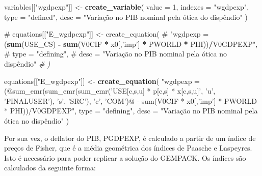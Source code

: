 \documentclass[12pt,twoside]{article}
\newenvironment{Shaded}{\begin{snugshade}}{\end{snugshade}}
\newcommand{\CommentTok}[1]{\textcolor[rgb]{0.56,0.35,0.01}{\textit{#1}}}
\newcommand{\DataTypeTok}[1]{\textcolor[rgb]{0.13,0.29,0.53}{#1}}
\newcommand{\DecValTok}[1]{\textcolor[rgb]{0.00,0.00,0.81}{#1}}
\newcommand{\KeywordTok}[1]{\textcolor[rgb]{0.13,0.29,0.53}{\textbf{#1}}}
\newcommand{\NormalTok}[1]{#1}
\newcommand{\OperatorTok}[1]{\textcolor[rgb]{0.81,0.36,0.00}{\textbf{#1}}}
\newcommand{\StringTok}[1]{\textcolor[rgb]{0.31,0.60,0.02}{#1}}
\let\oldShaded\Shaded
\let\endoldShaded\endShaded
\renewenvironment{Shaded}{\footnotesize\oldShaded}{\endoldShaded}
\begin{document}
\begin{Shaded}
\begin{Highlighting}[]
\NormalTok{variables[[}\StringTok{"wgdpexp"}\NormalTok{]] <-}\StringTok{ }\KeywordTok{create_variable}\NormalTok{(}
  \DataTypeTok{value =} \DecValTok{1}\NormalTok{,}
  \DataTypeTok{indexes =} \StringTok{"wgdpexp"}\NormalTok{,}
  \DataTypeTok{type =} \StringTok{"defined"}\NormalTok{,}
  \DataTypeTok{desc =} \StringTok{"Variação no PIB nominal pela ótica do dispêndio"}
\StringTok{)}

\StringTok{# equations[["}\NormalTok{E_wgdpexp}\StringTok{"]] <- create_equation(}
\StringTok{#   "}\DataTypeTok{wgdpexp =}\NormalTok{ (}\KeywordTok{sum}\NormalTok{(USE_CS) }\OperatorTok{-}\StringTok{ }\KeywordTok{sum}\NormalTok{(V0CIF }\OperatorTok{*}\StringTok{ }\NormalTok{x0[,}\StringTok{'imp'}\NormalTok{] }\OperatorTok{*}\StringTok{ }\NormalTok{PWORLD }\OperatorTok{*}\StringTok{ }\NormalTok{PHI))}\OperatorTok{/}\NormalTok{V0GDPEXP}\StringTok{",}
\StringTok{#   type = "}\NormalTok{defining}\StringTok{",}
\StringTok{#   desc = "}\NormalTok{Variação no PIB nominal pela ótica no dispêndio"}
\CommentTok{# )}

\NormalTok{equations[[}\StringTok{"E_wgdpexp"}\NormalTok{]] <-}\StringTok{ }\KeywordTok{create_equation}\NormalTok{(}
  \StringTok{"wgdpexp = (@sum_emr(sum_emr(sum_emr('USE[c,s,u] * p[c,s] * x[c,s,u]',}
\StringTok{  'u', 'FINALUSER'), 's', 'SRC'), 'c', 'COM')@}
\StringTok{  - sum(V0CIF * x0[,'imp'] * PWORLD * PHI))/V0GDPEXP"}\NormalTok{,}
  \DataTypeTok{type =} \StringTok{"defining"}\NormalTok{,}
  \DataTypeTok{desc =} \StringTok{"Variação no PIB nominal pela ótica no dispêndio"}
\StringTok{)}
\end{Highlighting}
\end{Shaded}

Por sua vez, o deflator do PIB, PGDPEXP, é calculado a partir de um
índice de preços de Fisher, que é a média geométrica dos índices de
Paasche e Laspeyres. Isto é necessário para poder replicar a solução do
GEMPACK. Os índices são calculados da seguinte forma:
\end{document}
